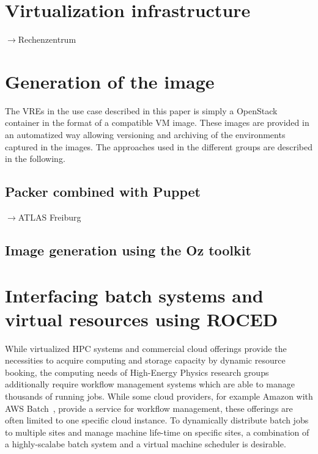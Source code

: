\section{Virtualization infrastructure}
\label{sec:openstack}
$\to$Rechenzentrum\\

\section{Generation of the image}
The VREs in the use case described in this paper is simply a OpenStack container
in the format of a compatible VM image.
These images are provided in an automatized
way allowing versioning and archiving of the environments captured in
the images. The approaches used in the
different groups are described in the following.

\subsection{Packer combined with Puppet}
$\to$ATLAS Freiburg\\




\subsection{Image generation using the Oz toolkit}


\section{Interfacing batch systems and virtual resources using ROCED}
\label{section:roced}
While virtualized HPC systems and commercial cloud offerings provide the necessities to acquire computing and storage capacity by dynamic resource booking, the computing needs of High-Energy Physics research groups additionally require workflow management systems which are able to manage thousands of running jobs. While some cloud providers, for example Amazon with AWS Batch~\cite{awsbatch}, provide a service for workflow management, these offerings are often limited to one specific cloud instance. To dynamically distribute batch jobs to multiple sites and manage machine life-time on specific sites, a combination of a highly-scalabe batch system and a virtual machine scheduler is desirable.

